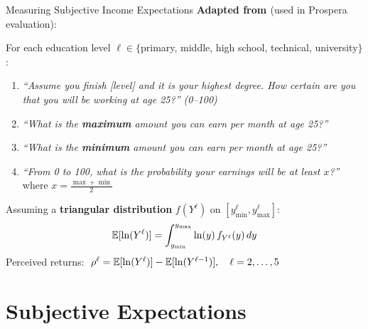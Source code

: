 \documentclass[aspectratio=169, 10pt]{beamer}
\begin{document}
\begin{frame}{Measuring Subjective Income Expectations}
  \textbf{Adapted from \citet{Attanasio2012}} (used in Prospera evaluation):

  \vspace{0.5em}
  For each education level $\ell \in \{$primary, middle, high school, technical, university$\}$:
  \begin{enumerate}
    \item \emph{``Assume you finish [level] and it is your highest degree. How certain are you that you will be working at age 25?'' (0--100)}
    \item \emph{``What is the \textbf{maximum} amount you can earn per month at age 25?''}
    \item \emph{``What is the \textbf{minimum} amount you can earn per month at age 25?''}
    \item \emph{``From 0 to 100, what is the probability your earnings will be at least $x$?''} where $x = \tfrac{\max + \min}{2}$
  \end{enumerate}

  \vspace{0.5em}
  \begin{methodbox}
    Assuming a \textbf{triangular distribution} $f(Y^\ell)$ on $[y^\ell_{\min}, y^\ell_{\max}]$:
    \[
      \mathbb{E}[\ln(Y^\ell)] = \int_{y_{\min}}^{y_{\max}} \ln(y)\, f_{Y^\ell}(y)\, dy
    \]
    Perceived returns: $\;\rho^\ell = \mathbb{E}[\ln(Y^\ell)] - \mathbb{E}[\ln(Y^{\ell-1})],\quad \ell = 2,\ldots,5$
  \end{methodbox}
\end{frame}

\section{Subjective Expectations}
\end{document}

